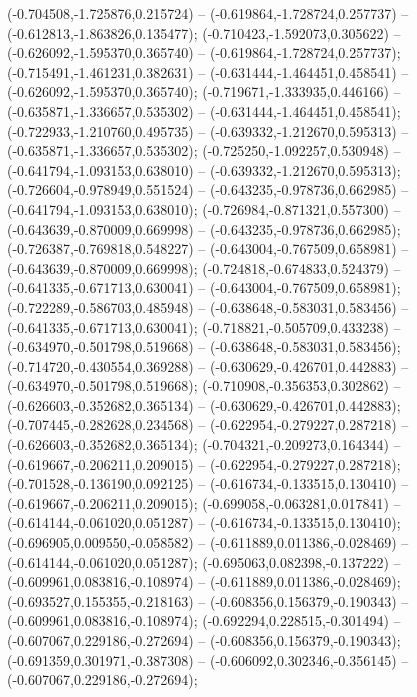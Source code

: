  (-0.704508,-1.725876,0.215724) -- (-0.619864,-1.728724,0.257737) -- (-0.612813,-1.863826,0.135477);
 (-0.710423,-1.592073,0.305622) -- (-0.626092,-1.595370,0.365740) -- (-0.619864,-1.728724,0.257737);
 (-0.715491,-1.461231,0.382631) -- (-0.631444,-1.464451,0.458541) -- (-0.626092,-1.595370,0.365740);
 (-0.719671,-1.333935,0.446166) -- (-0.635871,-1.336657,0.535302) -- (-0.631444,-1.464451,0.458541);
 (-0.722933,-1.210760,0.495735) -- (-0.639332,-1.212670,0.595313) -- (-0.635871,-1.336657,0.535302);
 (-0.725250,-1.092257,0.530948) -- (-0.641794,-1.093153,0.638010) -- (-0.639332,-1.212670,0.595313);
 (-0.726604,-0.978949,0.551524) -- (-0.643235,-0.978736,0.662985) -- (-0.641794,-1.093153,0.638010);
 (-0.726984,-0.871321,0.557300) -- (-0.643639,-0.870009,0.669998) -- (-0.643235,-0.978736,0.662985);
 (-0.726387,-0.769818,0.548227) -- (-0.643004,-0.767509,0.658981) -- (-0.643639,-0.870009,0.669998);
 (-0.724818,-0.674833,0.524379) -- (-0.641335,-0.671713,0.630041) -- (-0.643004,-0.767509,0.658981);
 (-0.722289,-0.586703,0.485948) -- (-0.638648,-0.583031,0.583456) -- (-0.641335,-0.671713,0.630041);
 (-0.718821,-0.505709,0.433238) -- (-0.634970,-0.501798,0.519668) -- (-0.638648,-0.583031,0.583456);
 (-0.714720,-0.430554,0.369288) -- (-0.630629,-0.426701,0.442883) -- (-0.634970,-0.501798,0.519668);
 (-0.710908,-0.356353,0.302862) -- (-0.626603,-0.352682,0.365134) -- (-0.630629,-0.426701,0.442883);
 (-0.707445,-0.282628,0.234568) -- (-0.622954,-0.279227,0.287218) -- (-0.626603,-0.352682,0.365134);
 (-0.704321,-0.209273,0.164344) -- (-0.619667,-0.206211,0.209015) -- (-0.622954,-0.279227,0.287218);
 (-0.701528,-0.136190,0.092125) -- (-0.616734,-0.133515,0.130410) -- (-0.619667,-0.206211,0.209015);
 (-0.699058,-0.063281,0.017841) -- (-0.614144,-0.061020,0.051287) -- (-0.616734,-0.133515,0.130410);
 (-0.696905,0.009550,-0.058582) -- (-0.611889,0.011386,-0.028469) -- (-0.614144,-0.061020,0.051287);
 (-0.695063,0.082398,-0.137222) -- (-0.609961,0.083816,-0.108974) -- (-0.611889,0.011386,-0.028469);
 (-0.693527,0.155355,-0.218163) -- (-0.608356,0.156379,-0.190343) -- (-0.609961,0.083816,-0.108974);
 (-0.692294,0.228515,-0.301494) -- (-0.607067,0.229186,-0.272694) -- (-0.608356,0.156379,-0.190343);
 (-0.691359,0.301971,-0.387308) -- (-0.606092,0.302346,-0.356145) -- (-0.607067,0.229186,-0.272694);
